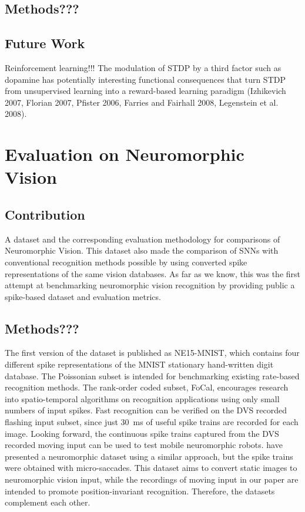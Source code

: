 \subsection{Methods???}

\subsection{Future Work}
Reinforcement learning!!!
The modulation of STDP by a third factor such as dopamine has potentially interesting functional consequences that turn STDP from unsupervised learning into a reward-based learning paradigm (Izhikevich 2007, Florian 2007, Pfister 2006, Farries and Fairhall 2008, Legenstein et al. 2008). 


\section{Evaluation on Neuromorphic Vision}


\subsection{Contribution}
A dataset and the corresponding evaluation methodology for comparisons of Neuromorphic Vision.
This dataset also made the comparison of SNNs with conventional recognition methods possible by using converted spike representations of the same vision databases.
As far as we know, this was the first attempt at benchmarking neuromorphic vision recognition by providing public a spike-based dataset and evaluation metrics.

\subsection{Methods???}
The first version of the dataset is published as NE15-MNIST, which contains four different spike representations of the MNIST stationary hand-written digit database.
The Poissonian subset is intended for benchmarking existing rate-based recognition methods.
The rank-order coded subset, FoCal, encourages research into spatio-temporal algorithms on recognition applications using only small numbers of input spikes.
Fast recognition can be verified on the DVS recorded flashing input subset, since just 30~ms of useful spike trains are recorded for each image.
Looking forward, the continuous spike trains captured from the DVS recorded moving input can be used to test mobile neuromorphic robots.
\cite{orchard2015convert} have presented a neuromorphic dataset using a similar approach, but the spike trains were obtained with micro-saccades.
This dataset aims to convert static images to neuromorphic vision input, while the recordings of moving input in our paper are intended to promote position-invariant recognition.
Therefore, the datasets complement each other.

